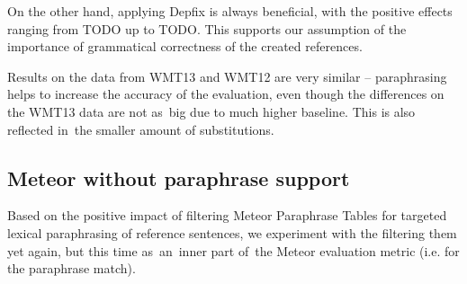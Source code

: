\documentclass[11pt]{article}
\begin{document}
\begin{table}[tb]
\begin{center}

\vspace{10pt}

\caption{Average number of replaced words/phrases per sentence.}
\label{lrec_replaced}
\end{center}
\end{table}

On the other hand, applying Depfix is always beneficial, with the positive 
effects ranging from TODO up to TODO. This supports our assumption of the 
importance of grammatical correctness of the created references.

Results on the data from WMT13 and WMT12 are very similar -- paraphrasing 
helps to increase the accuracy of the evaluation, even though the differences 
on the WMT13 data are not as~big due to much higher baseline. This is also 
reflected in~the smaller amount of substitutions.

\subsection{Meteor without paraphrase support}
\label{parmesan}
Based on the positive impact of filtering Meteor Paraphrase Tables for targeted
lexical paraphrasing of reference sentences, we experiment with the filtering 
them yet again, but this time as~an~inner part of~the Meteor evaluation metric 
(i.e. for the paraphrase match).
\end{document}
